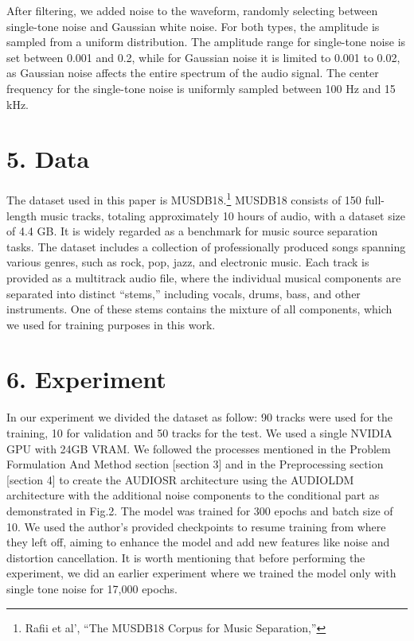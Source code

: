 \documentclass[
  ]{scrartcl}
\begin{document}
After filtering, we added noise to the waveform, randomly selecting
between single-tone noise and Gaussian white noise. For both types, the
amplitude is sampled from a uniform distribution. The amplitude range
for single-tone noise is set between 0.001 and 0.2, while for Gaussian
noise it is limited to 0.001 to 0.02, as Gaussian noise affects the
entire spectrum of the audio signal. The center frequency for the
single-tone noise is uniformly sampled between 100 Hz and 15 kHz.

\section{5. Data}\label{data}

The dataset used in this paper is MUSDB18.\footnote{Rafii et al', {``The
  MUSDB18 Corpus for Music Separation,''}} MUSDB18 consists of 150
full-length music tracks, totaling approximately 10 hours of audio, with
a dataset size of 4.4 GB. It is widely regarded as a benchmark for music
source separation tasks. The dataset includes a collection of
professionally produced songs spanning various genres, such as rock,
pop, jazz, and electronic music. Each track is provided as a multitrack
audio file, where the individual musical components are separated into
distinct ``stems,'' including vocals, drums, bass, and other
instruments. One of these stems contains the mixture of all components,
which we used for training purposes in this work.

\section{6. Experiment}\label{experiment}

In our experiment we divided the dataset as follow: 90 tracks were used
for the training, 10 for validation and 50 tracks for the test. We used
a single NVIDIA GPU with 24GB VRAM. We followed the processes mentioned
in the Problem Formulation And Method section {[}section 3{]} and in the
Preprocessing section {[}section 4{]} to create the AUDIOSR architecture
using the AUDIOLDM architecture with the additional noise components to
the conditional part as demonstrated in Fig.2. The model was trained for
300 epochs and batch size of 10. We used the author's provided
checkpoints to resume training from where they left off, aiming to
enhance the model and add new features like noise and distortion
cancellation. It is worth mentioning that before performing the
experiment, we did an earlier experiment where we trained the model only
with single tone noise for 17,000 epochs.
\end{document}
